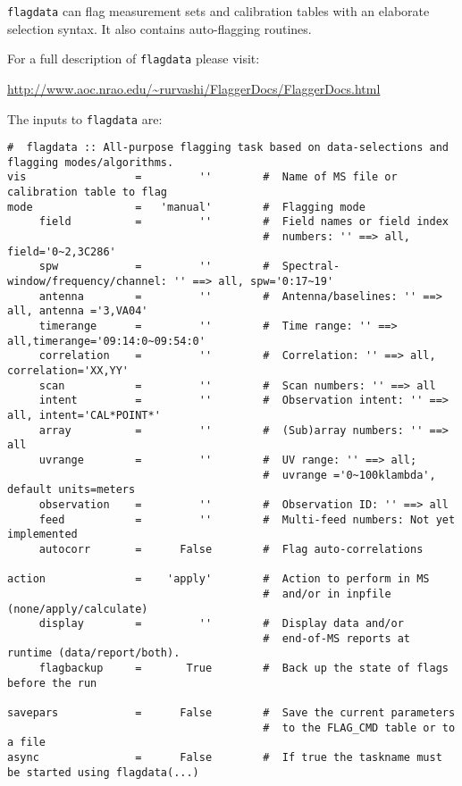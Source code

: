 {\tt flagdata} can flag measurement sets and calibration tables with
an elaborate selection syntax. It also contains auto-flagging
routines. 

For a full description of {\tt flagdata} please visit:

\url{http://www.aoc.nrao.edu/~rurvashi/FlaggerDocs/FlaggerDocs.html}

The inputs to {\tt flagdata} are:

\small
\begin{verbatim}
#  flagdata :: All-purpose flagging task based on data-selections and flagging modes/algorithms.
vis                 =         ''        #  Name of MS file or calibration table to flag
mode                =   'manual'        #  Flagging mode
     field          =         ''        #  Field names or field index
                                        #  numbers: '' ==> all, field='0~2,3C286'
     spw            =         ''        #  Spectral-window/frequency/channel: '' ==> all, spw='0:17~19'
     antenna        =         ''        #  Antenna/baselines: '' ==> all, antenna ='3,VA04'
     timerange      =         ''        #  Time range: '' ==> all,timerange='09:14:0~09:54:0'
     correlation    =         ''        #  Correlation: '' ==> all, correlation='XX,YY'
     scan           =         ''        #  Scan numbers: '' ==> all
     intent         =         ''        #  Observation intent: '' ==> all, intent='CAL*POINT*'
     array          =         ''        #  (Sub)array numbers: '' ==> all
     uvrange        =         ''        #  UV range: '' ==> all;
                                        #  uvrange ='0~100klambda', default units=meters
     observation    =         ''        #  Observation ID: '' ==> all
     feed           =         ''        #  Multi-feed numbers: Not yet implemented
     autocorr       =      False        #  Flag auto-correlations

action              =    'apply'        #  Action to perform in MS
                                        #  and/or in inpfile (none/apply/calculate)
     display        =         ''        #  Display data and/or
                                        #  end-of-MS reports at runtime (data/report/both).
     flagbackup     =       True        #  Back up the state of flags before the run

savepars            =      False        #  Save the current parameters
                                        #  to the FLAG_CMD table or to a file
async               =      False        #  If true the taskname must be started using flagdata(...)

\end{verbatim}
\normalsize

